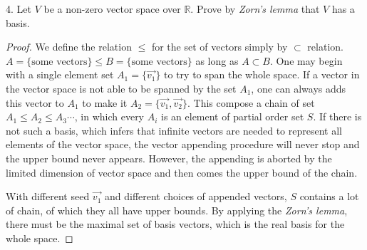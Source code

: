 \begin{exercise}
4. Let $V$ be a non-zero vector space over $\mathbb{R}$. Prove by \textit{Zorn's lemma}  that $V$ has a basis.
\end{exercise}
\begin{proof}
We define the relation $\leq$ for the set of vectors simply by $\subset$ relation. $A=\{\text{some vectors}\} \leq B=\{\text{some vectors}\}$ as long as $A \subset B$. One may begin with a single element set $A_1=\{\vec{v_1}\}$ to try to span the whole space. If a vector in the vector space is not able to be spanned by the set $A_1$, one can always adds this vector to $A_1$ to make it $A_2=\{\vec{v_1},\vec{v_2}\}$. This compose a chain of set $A_1\leq A_2 \leq A_3 \cdots$, in which every $A_i$ is an element of partial order set $S$.  If there is not such a basis, which infers that infinite vectors are needed to represent all elements of the vector space, the vector appending procedure will never stop and the upper bound never appears. However, the appending is aborted by the limited dimension of vector space and then comes the upper bound of the chain.

With different seed $\vec{v_1}$ and different choices of appended vectors, $S$ contains a lot of chain, of which they all have upper bounds. By applying the \textit{Zorn's lemma}, there must be the maximal set of basis vectors, which is the real basis for the whole space. 
\end{proof}